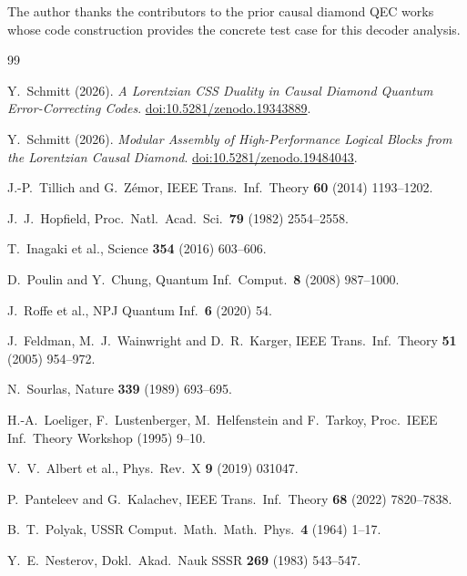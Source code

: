 \documentclass[12pt,a4paper]{article}
\theoremstyle{plain}
\theoremstyle{definition}
\theoremstyle{remark}
\begin{document}
The author thanks the contributors to the prior causal diamond QEC
works~\cite{SchmittCSS,SchmittScale} whose code construction provides
the concrete test case for this decoder analysis.

\begin{thebibliography}{99}

Y.~Schmitt (2026).
\emph{A Lorentzian CSS Duality in Causal Diamond Quantum Error-Correcting
Codes}. \href{https://doi.org/10.5281/zenodo.19343889}{doi:10.5281/zenodo.19343889}.

Y.~Schmitt (2026).
\emph{Modular Assembly of High-Performance Logical Blocks from the
Lorentzian Causal Diamond}. \href{https://doi.org/10.5281/zenodo.19484043}{doi:10.5281/zenodo.19484043}.

J.-P.~Tillich and G.~Z\'emor,
IEEE Trans.\ Inf.\ Theory \textbf{60} (2014) 1193--1202.

J.~J.~Hopfield,
Proc.\ Natl.\ Acad.\ Sci.\ \textbf{79} (1982) 2554--2558.

T.~Inagaki et al.,
Science \textbf{354} (2016) 603--606.

D.~Poulin and Y.~Chung,
Quantum Inf.\ Comput.\ \textbf{8} (2008) 987--1000.

J.~Roffe et al.,
NPJ Quantum Inf.\ \textbf{6} (2020) 54.

J.~Feldman, M.~J.~Wainwright and D.~R.~Karger,
IEEE Trans.\ Inf.\ Theory \textbf{51} (2005) 954--972.

N.~Sourlas,
Nature \textbf{339} (1989) 693--695.

H.-A.~Loeliger, F.~Lustenberger, M.~Helfenstein and F.~Tarkoy,
Proc.\ IEEE Inf.\ Theory Workshop (1995) 9--10.

V.~V.~Albert et al.,
Phys.\ Rev.\ X \textbf{9} (2019) 031047.

P.~Panteleev and G.~Kalachev,
IEEE Trans.\ Inf.\ Theory \textbf{68} (2022) 7820--7838.

B.~T.~Polyak,
USSR Comput.\ Math.\ Math.\ Phys.\ \textbf{4} (1964) 1--17.

Y.~E.~Nesterov,
Dokl.\ Akad.\ Nauk SSSR \textbf{269} (1983) 543--547.

\end{thebibliography}
\end{document}

